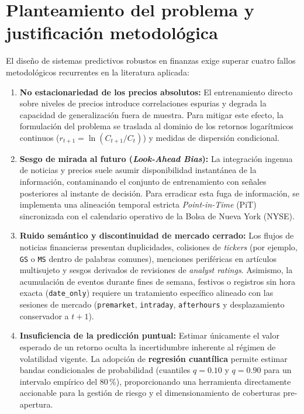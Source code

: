 \section{Planteamiento del problema y justificación metodológica}
El diseño de sistemas predictivos robustos en finanzas exige superar cuatro fallos metodológicos recurrentes en la literatura aplicada:

\begin{enumerate}
    \item \textbf{No estacionariedad de los precios absolutos:} El entrenamiento directo sobre niveles de precios introduce correlaciones espurias y degrada la capacidad de generalización fuera de muestra. Para mitigar este efecto, la formulación del problema se traslada al dominio de los retornos logarítmicos continuos ($r_{t+1} = \ln(C_{t+1}/C_t)$) y medidas de dispersión condicional.
    \item \textbf{Sesgo de mirada al futuro (\textit{Look-Ahead Bias}):} La integración ingenua de noticias y precios suele asumir disponibilidad instantánea de la información, contaminando el conjunto de entrenamiento con señales posteriores al instante de decisión. Para erradicar esta fuga de información, se implementa una alineación temporal estricta \textit{Point-in-Time} (PiT) sincronizada con el calendario operativo de la Bolsa de Nueva York (NYSE).
    \item \textbf{Ruido semántico y discontinuidad de mercado cerrado:} Los flujos de noticias financieras presentan duplicidades, colisiones de \textit{tickers} (por ejemplo, \texttt{GS} o \texttt{MS} dentro de palabras comunes), menciones periféricas en artículos multisujeto y sesgos derivados de revisiones de \textit{analyst ratings}. Asimismo, la acumulación de eventos durante fines de semana, festivos o registros sin hora exacta (\texttt{date\_only}) requiere un tratamiento específico alineado con las sesiones de mercado (\texttt{premarket}, \texttt{intraday}, \texttt{afterhours} y desplazamiento conservador a $t+1$).
    \item \textbf{Insuficiencia de la predicción puntual:} Estimar únicamente el valor esperado de un retorno oculta la incertidumbre inherente al régimen de volatilidad vigente. La adopción de \textbf{regresión cuantílica} permite estimar bandas condicionales de probabilidad (cuantiles $q=0.10$ y $q=0.90$ para un intervalo empírico del 80\,\%), proporcionando una herramienta directamente accionable para la gestión de riesgo y el dimensionamiento de coberturas pre-apertura.
\end{enumerate}

